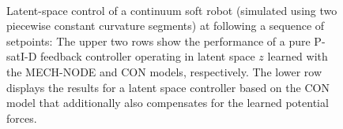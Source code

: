 \begin{figure}[ht]
    \\
    \caption{Latent-space control of a continuum soft robot (simulated using two piecewise constant curvature segments) at following a sequence of setpoints: The upper two rows show the performance of a pure P-satI-D feedback controller operating in latent space $z$ learned with the MECH-NODE and \gls{CON} models, respectively. The lower row displays the results for a latent space controller based on the \gls{CON} model that additionally also compensates for the learned potential forces.}\label{fig:con:latent_space_control_results}
\end{figure}

